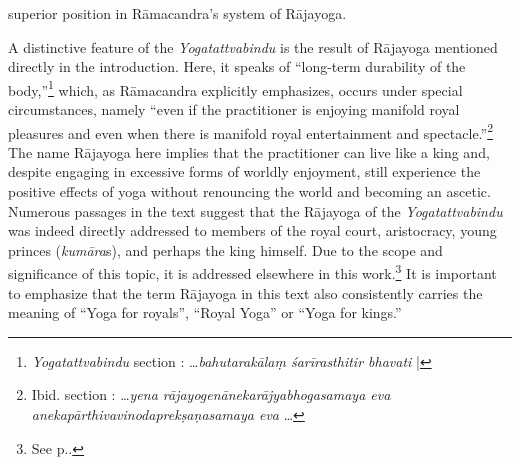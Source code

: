 superior position in Rāmacandra's system of Rājayoga.

A distinctive feature of the \emph{Yogatattvabindu} is the result of Rājayoga mentioned directly in the introduction. Here, it speaks of ``long-term durability of the body,''\footnote{\emph{Yogatattvabindu} section : \ldots \textit{bahutarakālaṃ śarīrasthitir bhavati} |} which, as Rāmacandra explicitly emphasizes, occurs under special circumstances, namely ``even if the practitioner is enjoying manifold royal pleasures and even when there is manifold royal entertainment and spectacle.''\footnote{Ibid. section : \ldots \textit{yena rājayogenānekarājyabhogasamaya eva anekapārthivavinodaprekṣaṇasamaya eva} \ldots} The name Rājayoga here implies that the practitioner can live like a king and, despite engaging in excessive forms of worldly enjoyment, still experience the positive effects of yoga without renouncing the world and becoming an ascetic. Numerous passages in the text suggest that the Rājayoga of the \textit{Yogatattvabindu} was indeed directly addressed to members of the royal court, aristocracy, young princes (\textit{kumāra}s), and perhaps the king himself. Due to the scope and significance of this topic, it is addressed elsewhere in this work.\footnote{See p.\pageref{ytbaudience}.} It is important to emphasize that the term Rājayoga in this text also consistently carries the meaning of ``Yoga for royals'', ``Royal Yoga'' or ``Yoga for kings.''

